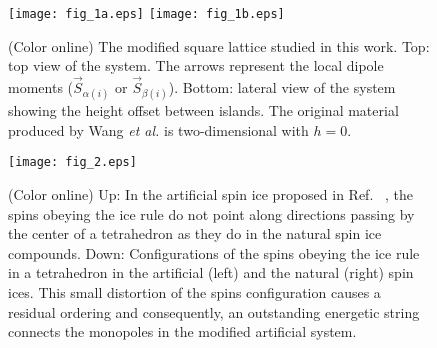 \documentclass[aps,prb,twocolumn,floatfix,showpacs,amsmath,amssymb]{revtex4}
\begin{document}
\begin{figure}
\texttt{[image: fig\_1a.eps]}
\texttt{[image: fig\_1b.eps]}
\caption{ \label{ModifiedSystem} (Color online) The modified
square lattice studied in this work. Top: top view of the
system. The arrows represent the local dipole moments
($\vec{S}_{\alpha(i)}$ or $\vec{S}_{\beta(i)}$).
Bottom: lateral view of the system showing the height offset
between islands. The original material produced by Wang \emph{et
al.}\cite{Wang06} is two-dimensional with $h=0$.}
\end{figure}

\begin{figure}
\texttt{[image: fig\_2.eps]}
\caption{\label{Vertices} (Color online) Up: In the artificial
spin ice proposed in Ref. ~, the spins
obeying the ice rule do not point along directions passing by the
center of a tetrahedron as they do in the natural spin ice
compounds. Down: Configurations of the spins obeying the ice rule
in a tetrahedron in the artificial (left) and the natural (right)
spin ices. This small distortion of the spins configuration causes
a residual ordering and consequently, an outstanding energetic
string connects the monopoles in the modified artificial system.}
\end{figure}
\end{document}
